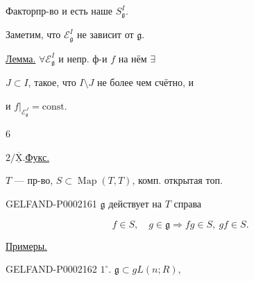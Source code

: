Факторпр-во и есть наше $S_{\mathfrak g}^I$.



Заметим, что $\mathcal E_{\mathfrak g}^I$ не зависит от $\mathfrak g$.



\underline{Лемма.} $\forall\mathcal E_{\mathfrak g}^I$ и непр. ф-и $f$ на нём $\exists$



$J\subset I$, такое, что $I\setminus J$ не более чем счётно, и



и $\left.f\right|_{\mathcal E_{\mathfrak g}^J}=\mathrm{const}$.





\begin{flushright}$6$\end{flushright}



$2/\overline{\underline{\mathrm X}}$.\quad\underline{\underline{Фукс.}}



$T$ --- пр-во, $S\subset\operatorname{Map}(T,T)$, комп. открытая топ.



\begin{GelfandAdjacentEvidence}{GELFAND-P000216}{1}
$\mathfrak g$ действует на $T$ справа
\end{GelfandAdjacentEvidence}

\begin{equation*}f\in S,\quad g\in\mathfrak g\Rightarrow fg\in S,\ gf\in S.\end{equation*}



\underline{Примеры.}



\begin{GelfandAdjacentEvidence}{GELFAND-P000216}{2}
$1^{\circ}$. $\mathfrak g\subset gL(n;R)$,
\end{GelfandAdjacentEvidence}

